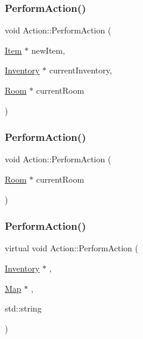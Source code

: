 \subsubsection{\texorpdfstring{Perform\+Action()}{PerformAction()}\hspace{0.1cm}{\footnotesize\ttfamily [2/7]}}
{\footnotesize\ttfamily void Action\+::\+Perform\+Action (\begin{DoxyParamCaption}\item[{\mbox{\hyperlink{class_item}{Item}} $\ast$}]{new\+Item,  }\item[{\mbox{\hyperlink{class_inventory}{Inventory}} $\ast$}]{current\+Inventory,  }\item[{\mbox{\hyperlink{class_room}{Room}} $\ast$}]{current\+Room }\end{DoxyParamCaption})\hspace{0.3cm}{\ttfamily [virtual]}}

\mbox{\label{class_action_a0da82536e6c7cec2088a3b1b9da2b16b}} 
\subsubsection{\texorpdfstring{Perform\+Action()}{PerformAction()}\hspace{0.1cm}{\footnotesize\ttfamily [3/7]}}
{\footnotesize\ttfamily void Action\+::\+Perform\+Action (\begin{DoxyParamCaption}\item[{\mbox{\hyperlink{class_room}{Room}} $\ast$}]{current\+Room }\end{DoxyParamCaption})\hspace{0.3cm}{\ttfamily [virtual]}}

\mbox{\label{class_action_a1d808c406aea6161349fa9216a9be8cb}} 
\subsubsection{\texorpdfstring{Perform\+Action()}{PerformAction()}\hspace{0.1cm}{\footnotesize\ttfamily [4/7]}}
{\footnotesize\ttfamily virtual void Action\+::\+Perform\+Action (\begin{DoxyParamCaption}\item[{\mbox{\hyperlink{class_inventory}{Inventory}} $\ast$}]{,  }\item[{\mbox{\hyperlink{class_map}{Map}} $\ast$}]{,  }\item[{std\+::string}]{ }\end{DoxyParamCaption})\hspace{0.3cm}{\ttfamily [virtual]}}

